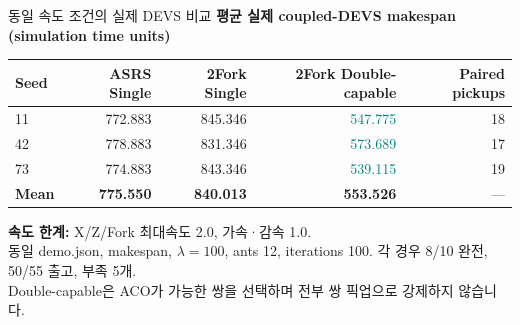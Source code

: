 \documentclass[aspectratio=169,11pt]{beamer}
\begin{document}
\begin{frame}{동일 속도 조건의 실제 DEVS 비교}
\small\color{teal}\bfseries 평균 실제 coupled-DEVS makespan (simulation time units)\par\vspace{0.3cm}
\centering
\renewcommand{\arraystretch}{1.12}
\begin{tabular}{lrrrr}
\toprule
Seed & ASRS Single & 2Fork Single & 2Fork Double-capable & Paired pickups\\
\midrule
11 & 772.883 & 845.346 & \textcolor{teal}{547.775} & 18\\
42 & 778.883 & 831.346 & \textcolor{teal}{573.689} & 17\\
73 & 774.883 & 843.346 & \textcolor{teal}{539.115} & 19\\
\midrule
\textbf{Mean} & \textbf{775.550} & \textbf{840.013} & \textbf{553.526} & ---\\
\bottomrule
\end{tabular}
\vspace{0.10cm}
\begin{flushleft}\scriptsize
\textbf{속도 한계:} X/Z/Fork 최대속도 2.0, 가속·감속 1.0.\\
동일 demo.json, makespan, $\lambda=100$, ants 12, iterations 100. 각 경우 8/10 완전, 50/55 출고, 부족 5개.\\
Double-capable은 ACO가 가능한 쌍을 선택하며 전부 쌍 픽업으로 강제하지 않습니다.
\end{flushleft}
\end{frame}
\end{document}
